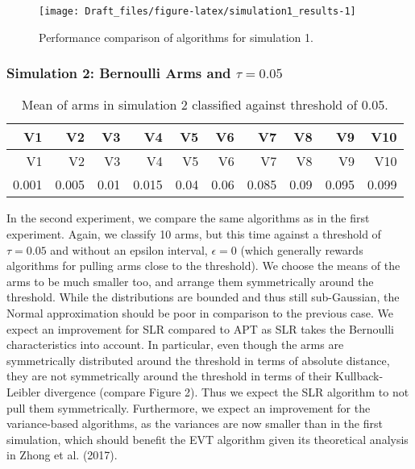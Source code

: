 \documentclass[11pt,]{article}
\begin{document}
\begin{figure}

{\centering \texttt{[image: Draft\_files/figure-latex/simulation1\_results-1]} 

}

\caption{Performance comparison of algorithms for simulation 1.}\label{fig:simulation1_results}
\end{figure}

\newpage

\subsubsection{\texorpdfstring{Simulation 2: Bernoulli Arms and
\(\tau = 0.05\)
\label{sec:Simulation2}}{Simulation 2: Bernoulli Arms and \textbackslash{}tau = 0.05 }}\label{simulation-2-bernoulli-arms-and-tau-0.05}

\begin{longtable}[]{@{}rrrrrrrrrr@{}}
\caption{Mean of arms in simulation 2 classified against threshold of
0.05.}\tabularnewline
\toprule
V1 & V2 & V3 & V4 & V5 & V6 & V7 & V8 & V9 & V10\tabularnewline
\midrule
\endfirsthead
\toprule
V1 & V2 & V3 & V4 & V5 & V6 & V7 & V8 & V9 & V10\tabularnewline
\midrule
\endhead
0.001 & 0.005 & 0.01 & 0.015 & 0.04 & 0.06 & 0.085 & 0.09 & 0.095 &
0.099\tabularnewline
\bottomrule
\end{longtable}

In the second experiment, we compare the same algorithms as in the first
experiment. Again, we classify 10 arms, but this time against a
threshold of \(\tau = 0.05\) and without an epsilon interval,
\(\epsilon = 0\) (which generally rewards algorithms for pulling arms
close to the threshold). We choose the means of the arms to be much
smaller too, and arrange them symmetrically around the threshold. While
the distributions are bounded and thus still sub-Gaussian, the Normal
approximation should be poor in comparison to the previous case. We
expect an improvement for SLR compared to APT as SLR takes the Bernoulli
characteristics into account. In particular, even though the arms are
symmetrically distributed around the threshold in terms of absolute
distance, they are not symmetrically around the threshold in terms of
their Kullback-Leibler divergence (compare Figure 2). Thus we expect the
SLR algorithm to not pull them symmetrically. Furthermore, we expect an
improvement for the variance-based algorithms, as the variances are now
smaller than in the first simulation, which should benefit the EVT
algorithm given its theoretical analysis in Zhong et al. (2017).
\end{document}
